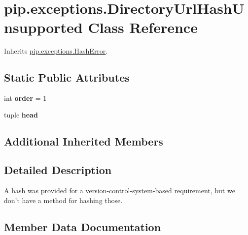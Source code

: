 \hypertarget{classpip_1_1exceptions_1_1_directory_url_hash_unsupported}{}\section{pip.\+exceptions.\+Directory\+Url\+Hash\+Unsupported Class Reference}
\label{classpip_1_1exceptions_1_1_directory_url_hash_unsupported}


Inherits \hyperlink{classpip_1_1exceptions_1_1_hash_error}{pip.\+exceptions.\+Hash\+Error}.

\subsection*{Static Public Attributes}
\begin{DoxyCompactItemize}
\item 
\mbox{\label{classpip_1_1exceptions_1_1_directory_url_hash_unsupported_af66f0946084d25ca08402099d84d717e}} 
int {\bfseries order} = 1
\item 
tuple {\bfseries head}
\end{DoxyCompactItemize}
\subsection*{Additional Inherited Members}


\subsection{Detailed Description}
\begin{DoxyVerb}A hash was provided for a version-control-system-based requirement, but
we don't have a method for hashing those.\end{DoxyVerb}
 

\subsection{Member Data Documentation}
\mbox{\label{classpip_1_1exceptions_1_1_directory_url_hash_unsupported_a3c7cc2aacaa9fb608307a53fa9c8d749}} 
